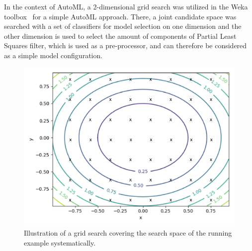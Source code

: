 In the context of AutoML, a 2-dimensional grid search was utilized in the Weka toolbox~\cite{Witten-Weka} for a simple AutoML approach.
There, a joint candidate space was searched with a set of classifiers for model selection on one dimension and the other dimension is used to select the amount of components of Partial Least Squares filter, which is used as a pre-processor, and can therefore be considered as a simple model configuration.
\begin{figure}[ht!]
    \centering
    \includegraphics[width=\textwidth]{gfx/Figures/Theory/GridSearch.pdf}
    \caption{Illustration of a grid search covering the search space of the running example systematically.}
    \label{fig:theory:grid-search}
\end{figure}



